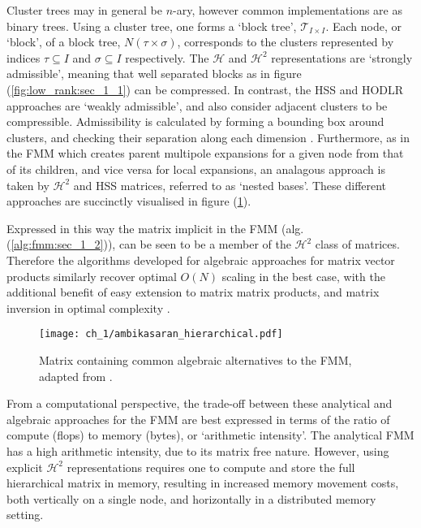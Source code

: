 Cluster trees may in general be $n$-ary, however common implementations are as binary trees. Using a cluster tree, one forms a `block tree', $\mathcal{T}_{I \times I}$. Each node, or `block', of a block tree, $N(\tau \times \sigma)$, corresponds to the clusters represented by indices $\tau \subseteq I$ and $\sigma \subseteq I$ respectively. The $\mathcal{H}$ and $\mathcal{H}^2$ representations are `strongly admissible', meaning that well separated blocks as in figure (\ref{fig:low_rank:sec_1_1}) can be compressed. In contrast, the HSS and HODLR approaches are `weakly admissible', and also consider adjacent clusters to be compressible. Admissibility is calculated by forming a bounding box around clusters, and checking their separation along each dimension \cite{borm2003introduction}. Furthermore, as in the FMM which creates parent multipole expansions for a given node from that of its children, and vice versa for local expansions, an analagous approach is taken by $\mathcal{H}^2$ and HSS matrices, referred to as `nested bases'. These different approaches are succinctly visualised in figure (\ref{fig:ambikasaran_hierarchical:sec_1_2}). 

Expressed in this way the matrix implicit in the FMM (alg. (\ref{alg:fmm:sec_1_2})), can be seen to be a member of the $\mathcal{H}^2$ class of matrices. Therefore the algorithms developed for algebraic approaches for matrix vector products similarly recover optimal $O(N)$ scaling in the best case, with the additional benefit of easy extension to matrix matrix products, and matrix inversion in optimal complexity \cite{borm2003introduction}.

\begin{figure}
    \centering
    \texttt{[image: ch\_1/ambikasaran\_hierarchical.pdf]}
    \caption{Matrix containing common algebraic alternatives to the FMM, adapted from \cite{ambikasaran2013fast}.}
    \label{fig:ambikasaran_hierarchical:sec_1_2}
\end{figure}

From a computational perspective, the trade-off between these analytical and algebraic approaches for the FMM are best expressed in terms of the ratio of compute (flops) to memory (bytes), or `arithmetic intensity'. The analytical FMM has a high arithmetic intensity, due to its matrix free nature. However, using explicit $\mathcal{H}^2$ representations requires one to compute and store the full hierarchical matrix in memory, resulting in increased memory movement costs, both vertically on a single node, and horizontally in a distributed memory setting. 

